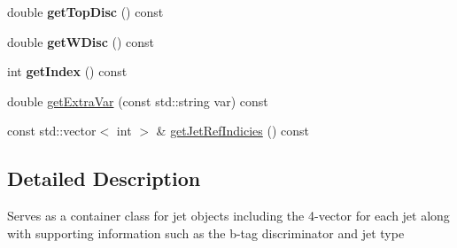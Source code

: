 \begin{DoxyCompactItemize}
\item 
\hypertarget{classConstituent_a5e6d49f8b60711586aed4506a07b538c}{double {\bfseries get\-Top\-Disc} () const }\label{classConstituent_a5e6d49f8b60711586aed4506a07b538c}

\item 
\hypertarget{classConstituent_a9184e1d6ed1691f6efd0c5083444c021}{double {\bfseries get\-W\-Disc} () const }\label{classConstituent_a9184e1d6ed1691f6efd0c5083444c021}

\item 
\hypertarget{classConstituent_a64e38c0209bf5198477160ea690bbaf9}{int {\bfseries get\-Index} () const }\label{classConstituent_a64e38c0209bf5198477160ea690bbaf9}

\item 
double \hyperlink{classConstituent_a8fc04ce34e4e9c162f3d02f62f6b50cb}{get\-Extra\-Var} (const std\-::string var) const 
\item 
const std\-::vector$<$ int $>$ \& \hyperlink{classConstituent_aaa1bb377b75859b50c40feb217c98cb9}{get\-Jet\-Ref\-Indicies} () const 
\end{DoxyCompactItemize}


\subsection{Detailed Description}
Serves as a container class for jet objects including the 4-\/vector for each jet along with supporting information such as the b-\/tag discriminator and jet type 

